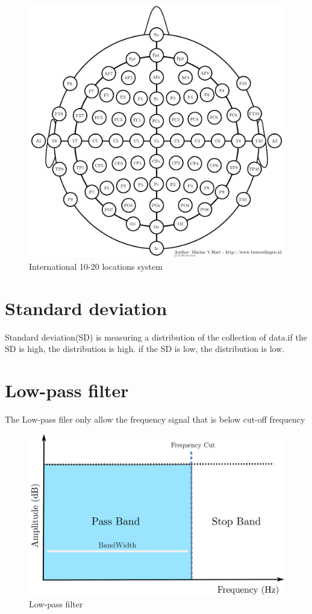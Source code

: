 \begin{figure}[ht]
	\centering
	\includegraphics[scale = 0.5]{chapter3/35.pdf}
	\caption{International 10-20 locations system\cite{ref15}}
\end{figure}

\newpage
\section{Standard deviation}
\hspace{1.5cm} Standard deviation(SD) is measuring a distribution of the collection of data.if the SD is high, the distribution is high. if the SD is low, the distribution is low.

\section{Low-pass filter}
\hspace{1.5cm}The Low-pass filer only allow the frequency signal that is below  cut-off frequency
\begin{figure}[ht]
	\centering
	\includegraphics[scale = 0.14]{chapter3/lowpass.pdf}
	\caption{Low-pass filter}
\end{figure}

